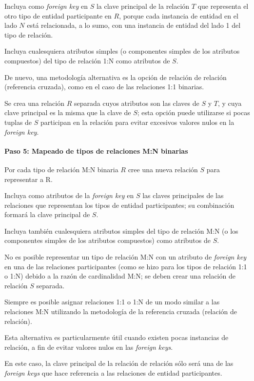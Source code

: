 Incluya como \textit{foreign key} en $S$ la clave principal de la relación $T$ que representa el otro tipo de entidad participante en $R$, porque cada instancia de entidad en el lado $N$ está relacionada, a lo sumo, con una instancia de entidad del lado 1 del tipo de relación. 


Incluya cualesquiera atributos simples (o componentes simples de los atributos compuestos) del tipo de relación 1:N como atributos de $S$.


De nuevo, una metodología alternativa es la opción de relación de relación (referencia cruzada), como en el
caso de las relaciones 1:1 binarias. 


Se crea una relación $R$ separada cuyos atributos son las claves de $S$ y $T$, y cuya clave principal es la misma que la clave de $S$; esta opción puede utilizarse si pocas tuplas de $S$ participan en la relación para evitar excesivos valores nulos en la \textit{foreign key}.


\paragraph*{Paso 5: Mapeado de tipos de relaciones M:N binarias}

Por cada tipo de relación M:N binaria $R$ cree una nueva relación $S$ para representar a R.


Incluya como atributos de la \textit{foreign key} en $S$ las claves principales de las relaciones que representan los tipos de entidad participantes; su combinación formará la clave principal de $S$.


Incluya también cualesquiera atributos simples del tipo de relación M:N (o los componentes simples de los atributos compuestos) como atributos de $S$.


No es posible representar un tipo de relación M:N con un atributo de \textit{foreign key} en una de las relaciones participantes (como se hizo para los tipos de relación 1:1 o 1:N) debido a la razón de cardinalidad M:N; se deben crear una relación de relación $S$ separada.

Siempre es posible asignar relaciones 1:1 o 1:N de un modo similar a las relaciones M:N utilizando la metodología de la referencia cruzada (relación de relación). 


Esta alternativa es particularmente útil cuando existen pocas instancias de relación, a fin de evitar valores nulos en las \textit{foreign keys}.


En este caso, la clave principal de la relación de relación sólo será una de las \textit{foreign keys} que hace referencia a las relaciones de entidad participantes. 


